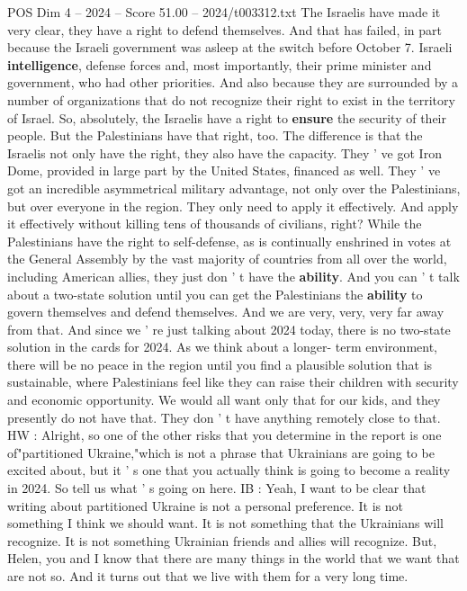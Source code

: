 \begin{textsample}{POS Dim 4 – 2024 – Score 51.00 – 2024/t003312.txt}
The Israelis have made it very clear, they have a right to defend themselves.
And that has failed, in part because the Israeli government was asleep at the switch before October 7.
Israeli \textbf{intelligence}, defense forces and, most importantly, their prime minister and government, who had other priorities.
And also because they are surrounded by a number of organizations that do not recognize their right to exist in the territory of Israel.
So, absolutely, the Israelis have a right to \textbf{ensure} the security of their people.
But the Palestinians have that right, too.
The difference is that the Israelis not only have the right, they also have the capacity.
They ' ve got Iron Dome, provided in large part by the United States, financed as well.
They ' ve got an incredible asymmetrical military advantage, not only over the Palestinians, but over everyone in the region.
They only need to apply it effectively.
And apply it effectively without killing tens of thousands of civilians, right?
While the Palestinians have the right to self-defense, as is continually enshrined in votes at the General Assembly by the vast majority of countries from all over the world, including American allies, they just don ' t have the \textbf{ability}.
And you can ' t talk about a two-state solution until you can get the Palestinians the \textbf{ability} to govern themselves and defend themselves.
And we are very, very, very far away from that.
And since we ' re just talking about 2024 today, there is no two-state solution in the cards for 2024.
As we think about a longer- term environment, there will be no peace in the region until you find a plausible solution that is sustainable, where Palestinians feel like they can raise their children with security and economic opportunity.
We would all want only that for our kids, and they presently do not have that.
They don ' t have anything remotely close to that.
HW : Alright, so one of the other risks that you determine in the report is one of"partitioned Ukraine,"which is not a phrase that Ukrainians are going to be excited about, but it ' s one that you actually think is going to become a reality in 2024.
So tell us what ' s going on here.
IB : Yeah, I want to be clear that writing about partitioned Ukraine is not a personal preference.
It is not something I think we should want.
It is not something that the Ukrainians will recognize.
It is not something Ukrainian friends and allies will recognize.
But, Helen, you and I know that there are many things in the world that we want that are not so.
And it turns out that we live with them for a very long time.

\end{textsample}
